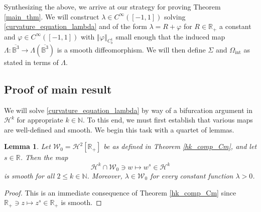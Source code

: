 \documentclass[11pt,reqno]{amsart}
\numberwithin{equation}{section}
\providecommand{\norm}[1]{\left\Vert#1\right\Vert}
\providecommand{\norm}[1]{\left\Vert#1\right\Vert}
\newcommand{\m}{\mathrm}
\def\h{\mathcal{H}}
\def\N{\mathbb{N}}
\def\R{\mathbb{R}}
\newtheorem{lem}{Lemma}[section]
\begin{document}
Synthesizing the above, we arrive at our strategy for proving Theorem \ref{main_thm}.  We will construct $\lambda \in C^\infty([-1,1])$ solving \eqref{curvature_equation_lambda} and of the form $\lambda = R + \varphi$ for $R \in \R_+$ a constant and $\varphi \in C^\infty([-1,1])$ with $\norm{\varphi}_{C^1_b}$ small enough that the induced map  $\Lambda: \overline{\mathbb B^3} \to \Lambda(\overline{\mathbb{B}^3})$  is a smooth diffeomorphism.  We will then define $\Sigma$ and $\Omega_{\m{int}}$ as stated in terms of $\Lambda$.  


 
\subsection{Proof of main result}

We will solve \eqref{curvature_equation_lambda} by way of a bifurcation argument in $\h^k$ for appropriate $k \in \N$.  To this end, we must first establish that various maps are well-defined and smooth.  We begin this task with a quartet of lemmas.

\begin{lem}\label{map_lemma_1}
Let $\mathcal{W}_0 = \h^2[\R_+]$ be as defined in Theorem \ref{hk_comp_Cm}, and let $s \in \R$.  Then the map 
\begin{equation}
 \h^k \cap \mathcal{W}_0 \ni w \mapsto w^{s} \in \h^k 
\end{equation}
is smooth  for all $2 \le k \in \N$.  Moreover, $\lambda \in \mathcal{W}_0$ for every constant function $\lambda >0$.  
\end{lem}
\begin{proof}
 This is an immediate consequence of Theorem \ref{hk_comp_Cm} since $\R_+ \ni z \mapsto z^s \in \R_+$ is smooth.
\end{proof}
\end{document}
